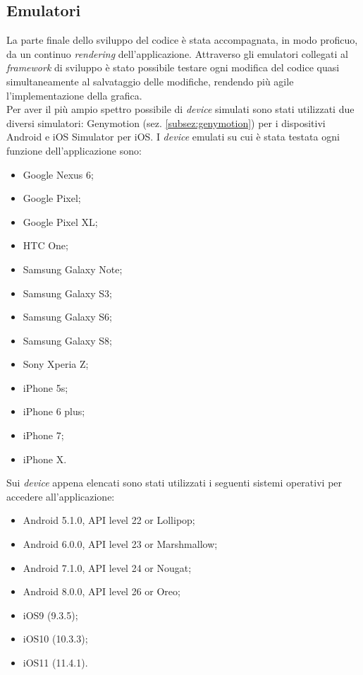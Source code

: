 \subsection{Emulatori}
La parte finale dello sviluppo del codice è stata accompagnata, in modo proficuo, da un continuo \emph{rendering} dell'applicazione. Attraverso gli emulatori collegati al \emph{framework} di sviluppo è stato possibile testare ogni modifica del codice quasi simultaneamente al salvataggio delle modifiche, rendendo più agile l'implementazione della grafica. \\
Per aver il più ampio spettro possibile di \emph{device} simulati sono stati utilizzati due diversi simulatori: Genymotion (sez. \ref{subsez:genymotion}) per i dispositivi Android e iOS Simulator per iOS.
I \emph{device} emulati su cui è stata testata ogni funzione dell'applicazione sono:
\begin{itemize}
	\item Google Nexus 6;
	\item Google Pixel;
	\item Google Pixel XL;
	\item HTC One;
	\item Samsung Galaxy Note;
	\item Samsung Galaxy S3;
	\item Samsung Galaxy S6;
	\item Samsung Galaxy S8;
	\item Sony Xperia Z;
	\item iPhone 5s;
	\item iPhone 6 plus;
	\item iPhone 7;
	\item iPhone X.
\end{itemize}
Sui \emph{device} appena elencati sono stati utilizzati i seguenti sistemi operativi per accedere all'applicazione:
\begin{itemize}
	\item Android 5.1.0, API level 22 or Lollipop;
	\item Android 6.0.0, API level 23 or Marshmallow;
	\item Android 7.1.0,  API level 24 or Nougat;
	\item Android 8.0.0,  API level 26 or Oreo;
	\item iOS9 (9.3.5);
	\item iOS10 (10.3.3);
	\item iOS11 (11.4.1).
\end{itemize}
